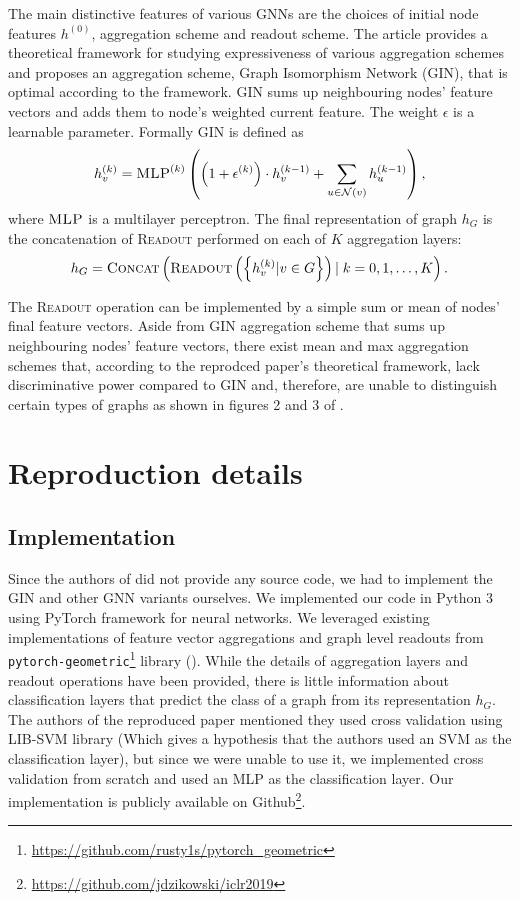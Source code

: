 \documentclass{article} %
\begin{document}
The main distinctive features of various GNNs are the choices of initial node features $h^{(0)}$, aggregation scheme and readout scheme. The article \cite{ThePaper} provides a theoretical framework for studying expressiveness of various aggregation schemes and proposes an aggregation scheme, Graph Isomorphism Network (GIN), that is optimal according to the framework. GIN sums up neighbouring nodes' feature vectors and adds them to node's weighted current feature. The weight $\epsilon$ is a learnable parameter. Formally GIN is defined as
\begin{equation}
    \label{gin-equation}
    h_v^{(k)} = \textsc{MLP}^{(k)}\left(\left(1+\epsilon^{(k)}\right) \cdot h_v^{(k-1)} + \sum_{u \in \mathcal{N}(v)}h_u^{(k-1)}\right), 
\end{equation}
where $\textsc{MLP}$ is a multilayer perceptron. The final representation of graph $h_G$ is the concatenation of \textsc{Readout} performed on each of $K$ aggregation layers:
\begin{equation}
    \label{gin-readout}
    h_G = \textsc{Concat}\left(\textsc{Readout}\left(\left\{h_v^{(k)} | v \in G\right\}\right) |\; k = 0,1,\ldots,K\right).
\end{equation}

The \textsc{Readout} operation can be implemented by a simple sum or mean of nodes' final feature vectors. Aside from GIN aggregation scheme that sums up neighbouring nodes' feature vectors, there exist mean and max aggregation schemes that, according to the reprodced paper's theoretical framework, lack discriminative power compared to GIN and, therefore, are unable to distinguish certain types of graphs as shown in figures 2 and 3 of \cite{ThePaper}.
\section{Reproduction details}

\subsection{Implementation}
Since the authors of \cite{ThePaper} did not provide any source code, we had to implement the GIN and other GNN variants ourselves. We implemented our code in Python 3 using PyTorch framework for neural networks. We leveraged existing implementations of feature vector aggregations and graph level readouts from \verb+pytorch-geometric+\footnote{\url{https://github.com/rusty1s/pytorch_geometric}} library (\cite{Fey/etal/2018}). While the details of aggregation layers and readout operations have been provided, there is little information about classification layers that predict the class of a graph from its representation $h_G$. The authors of the reproduced paper mentioned they used cross validation using LIB-SVM library (Which gives a hypothesis that the authors used an SVM as the classification layer), but since we were unable to use it, we implemented cross validation from scratch and used an MLP as the classification layer. Our implementation is publicly available on Github\footnote{\url{https://github.com/jdzikowski/iclr2019}}.
\end{document}

